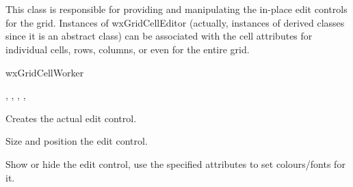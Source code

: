%
%

\section{}\label{wxgridcelleditor}

This class is responsible for providing and manipulating
the in-place edit controls for the grid.  Instances of wxGridCellEditor
(actually, instances of derived classes since it is an abstract class) can be
associated with the cell attributes for individual cells, rows, columns, or
even for the entire grid.


wxGridCellWorker


,\rtfsp
{},\rtfsp
{},\rtfsp
{},\rtfsp
{}


\label{wxgridcelleditorwxgridcelleditor}


\label{wxgridcelleditoriscreated}


\label{wxgridcelleditorcreate}


Creates the actual edit control.

\label{wxgridcelleditorsetsize}


Size and position the edit control.

\label{wxgridcelleditorshow}


Show or hide the edit control, use the specified attributes to set
colours/fonts for it.

